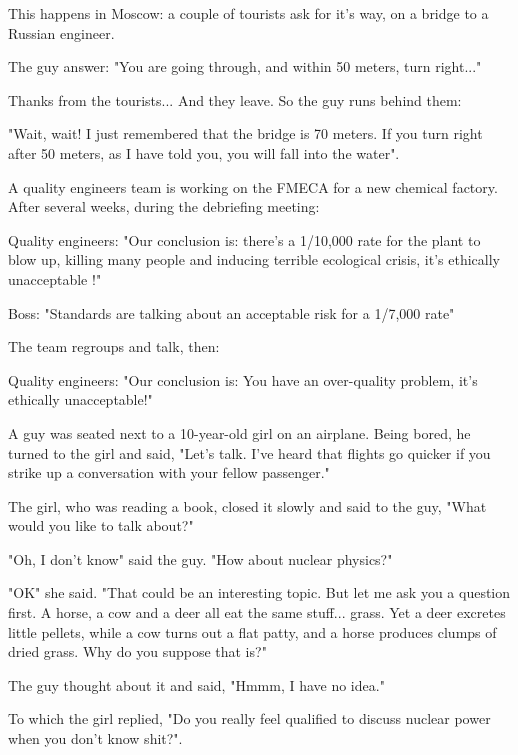 This happens in Moscow: a couple of tourists ask for it's way, on a bridge to a Russian engineer.

The guy answer: "You are going through, and within 50 meters, turn right..."

Thanks from the tourists... And they leave. So the guy runs behind them:

"Wait, wait! I just remembered that the bridge is 70 meters. If you turn right after 50 meters, as I have told you, you will fall into the water".
\begin{center}\underline{\hspace{5 cm}}\end{center}

A quality engineers team is working on the FMECA for a new chemical factory. After several weeks, during the debriefing meeting: 

Quality engineers: "Our conclusion is: there's a 1/10,000 rate for the plant to blow up, killing many people and inducing terrible ecological crisis, it's ethically unacceptable !" 

Boss: "Standards are talking about an acceptable risk for a 1/7,000 rate" 

The team regroups and talk, then: 

Quality engineers: "Our conclusion is: You have an over-quality problem, it's ethically unacceptable!"
\begin{center}\underline{\hspace{5 cm}}\end{center}

A guy was seated next to a 10-year-old girl on an airplane. Being bored, he turned to the girl and said, "Let's talk. I've heard that flights go quicker if you strike up a conversation with your fellow passenger."

The girl, who was reading a book, closed it slowly and said to the guy, "What would you like to talk about?"

"Oh, I don't know" said the guy. "How about nuclear physics?"

"OK" she said. "That could be an interesting topic. But let me ask you a question first. A horse, a cow and a deer all eat the same stuff... grass. Yet a deer excretes little pellets, while a cow turns out a flat patty, and a horse produces clumps of dried grass. Why do you suppose that is?"

The guy thought about it and said, "Hmmm, I have no idea."

To which the girl replied, "Do you really feel qualified to discuss nuclear power when you don't know shit?".

